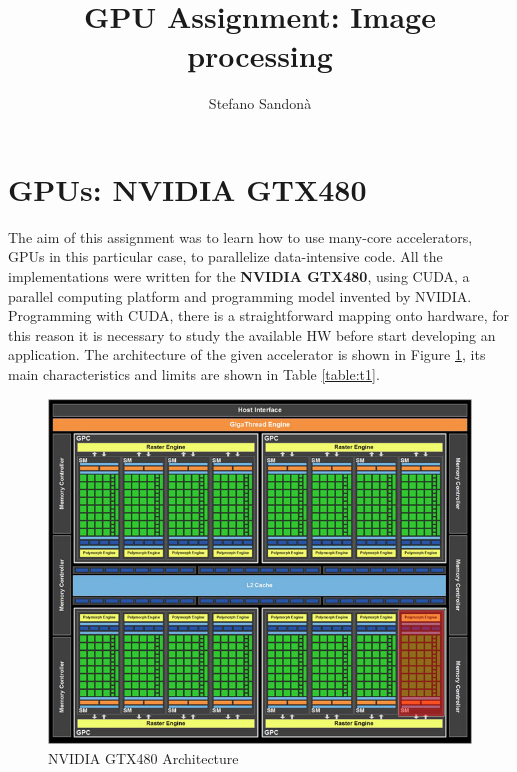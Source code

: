 \documentclass[a4paper]{article}
\begin{document}
\title{GPU Assignment: Image processing}
\author{Stefano Sandonà}
\date{}
		
\maketitle

\section{GPUs: NVIDIA GTX480}
\label{sec:nvidia}
The aim of this assignment was to learn how to use many-core accelerators, GPUs in this particular case, to parallelize data-intensive code. All the implementations were written for the \textbf{NVIDIA GTX480}, using CUDA, a parallel computing platform and programming model invented by NVIDIA. Programming with CUDA, there is a straightforward mapping onto hardware, for this reason it is necessary to study the available HW before start developing an application. The architecture of the given accelerator is shown in Figure \ref{fig:gtx}, its main characteristics and limits are shown in Table \ref{table:t1}.

\begin{figure}[!ht]
    \centering
    \includegraphics[width=0.7\linewidth]{gtx}
    \caption{NVIDIA GTX480 Architecture}
    \label{fig:gtx}
\end{figure}
\FloatBarrier
\end{document}
